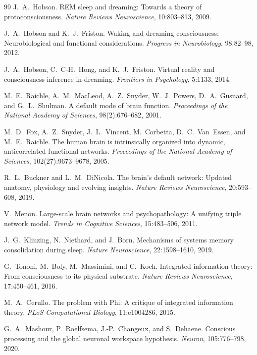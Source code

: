 \documentclass[11pt]{article}
\begin{document}
\begin{thebibliography}{99}
J.~A.~Hobson.
\newblock REM sleep and dreaming: Towards a theory of
protoconsciousness.
\newblock \emph{Nature Reviews Neuroscience}, 10:803--813, 2009.

J.~A.~Hobson and K.~J.~Friston.
\newblock Waking and dreaming consciousness: Neurobiological and
functional considerations.
\newblock \emph{Progress in Neurobiology}, 98:82--98, 2012.

J.~A.~Hobson, C.~C-H.~Hong, and K.~J.~Friston.
\newblock Virtual reality and consciousness inference in dreaming.
\newblock \emph{Frontiers in Psychology}, 5:1133, 2014.

M.~E.~Raichle, A.~M.~MacLeod, A.~Z.~Snyder, W.~J.~Powers, D.~A.~Gusnard,
and G.~L.~Shulman.
\newblock A default mode of brain function.
\newblock \emph{Proceedings of the National Academy of Sciences},
98(2):676--682, 2001.

M.~D.~Fox, A.~Z.~Snyder, J.~L.~Vincent, M.~Corbetta, D.~C.~Van~Essen,
and M.~E.~Raichle.
\newblock The human brain is intrinsically organized into dynamic,
anticorrelated functional networks.
\newblock \emph{Proceedings of the National Academy of Sciences},
102(27):9673--9678, 2005.

R.~L.~Buckner and L.~M.~DiNicola.
\newblock The brain's default network: Updated anatomy, physiology and
evolving insights.
\newblock \emph{Nature Reviews Neuroscience}, 20:593--608, 2019.

V.~Menon.
\newblock Large-scale brain networks and psychopathology: A unifying
triple network model.
\newblock \emph{Trends in Cognitive Sciences}, 15:483--506, 2011.

J.~G.~Klinzing, N.~Niethard, and J.~Born.
\newblock Mechanisms of systems memory consolidation during sleep.
\newblock \emph{Nature Neuroscience}, 22:1598--1610, 2019.

G.~Tononi, M.~Boly, M.~Massimini, and C.~Koch.
\newblock Integrated information theory: From consciousness to its
physical substrate.
\newblock \emph{Nature Reviews Neuroscience}, 17:450--461, 2016.

M.~A.~Cerullo.
\newblock The problem with Phi: A critique of integrated information
theory.
\newblock \emph{PLoS Computational Biology}, 11:e1004286, 2015.

G.~A.~Mashour, P.~Roelfsema, J.-P.~Changeux, and S.~Dehaene.
\newblock Conscious processing and the global neuronal workspace
hypothesis.
\newblock \emph{Neuron}, 105:776--798, 2020.


\end{thebibliography}
\end{document}
